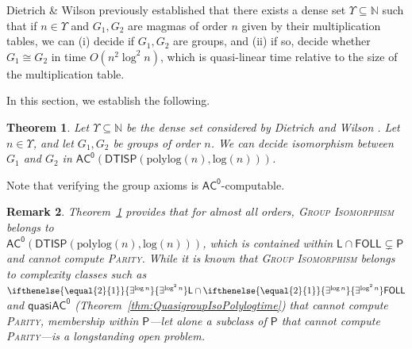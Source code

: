 \documentclass{article}
\newtheorem{theorem}{Theorem}\newtheorem{lemma}[theorem]{Lemma}\newtheorem{proposition}[theorem]{Proposition}\newtheorem{corollary}[theorem]{Corollary}\newtheorem{definition}[theorem]{Definition}\newtheorem{claim}[theorem]{Claim}\newtheorem{remark}[theorem]{Remark}\newtheorem{observation}[theorem]{Observation}\newtheorem{conjecture}[theorem]{Conjecture}\newtheorem{example}[theorem]{Example}
\newcommand{\algprobm}[1]{\textsc{#1}\xspace}
\newcommand{\betacc}[1]{\ifthenelse{\equal{#1}{1}}{\exists^{\log n}}{\exists^{\log^{#1}n}}} %
\newcommand*{\ComplexityClass}[1]{\ensuremath{\mathsf{#1}}\xspace}
\newcommand{\DTISP}{\ComplexityClass{DTISP}}
\newcommand{\DTISPpll}{\ensuremath{\DTISP(\mathrm{polylog}(n),\mathrm{log}(n))}\xspace}
\newcommand*{\LogSpace}{\ComplexityClass{L}}
\newcommand{\ACz}{\ComplexityClass{AC^0}}
\newcommand{\qACz}{\ComplexityClass{quasiAC^0}}
\newcommand{\FOLL}{\ComplexityClass{FOLL}}
\begin{document}
Dietrich \& Wilson \cite{DietrichWilson} previously established that there exists a dense set $\Upsilon \subseteq \mathbb{N}$ such that if $n \in \Upsilon$ and $G_{1}, G_{2}$ are magmas of order $n$ given by their multiplication tables, we can (i) decide if $G_{1}, G_{2}$ are groups, and (ii) if so, decide whether $G_{1} \cong G_{2}$ in time $O(n^{2} \log^{2} n)$, which is quasi-linear time relative to the size of the multiplication table.

In this section, we establish the following.

\begin{theorem} \label{thm:ParallelDW}
Let $\Upsilon \subseteq \mathbb{N}$ be the dense set considered by Dietrich and Wilson \cite{DietrichWilson}. Let $n \in \Upsilon$, and let $G_{1}, G_{2}$ be groups of order $n$. We can decide isomorphism between $G_{1}$ and $G_{2}$ in $\ACz(\DTISPpll)$.   
\end{theorem}

Note that verifying the group axioms is $\ACz$-computable. 

\begin{remark}
Theorem~\ref{thm:ParallelDW} provides that for almost all orders, \algprobm{Group Isomorphism} belongs to \\$\ACz(\DTISPpll)$, which is contained within $\LogSpace \cap \FOLL \subsetneq \mathsf{P}$ and cannot compute \algprobm{Parity}. While it is known that \algprobm{Group Isomorphism} belongs to complexity classes such as $\betacc{2}\LogSpace \cap \betacc{2}\mathsf{FOLL}$ \cite{ChattopadhyayToranWagner} and $\qACz$ (Theorem~\ref{thm:QuasigroupIsoPolylogtime}) that cannot compute \algprobm{Parity}, membership within $\mathsf{P}$---let alone a subclass of $\mathsf{P}$ that cannot compute \algprobm{Parity}---is a longstanding open problem.
\end{remark}
\end{document}

